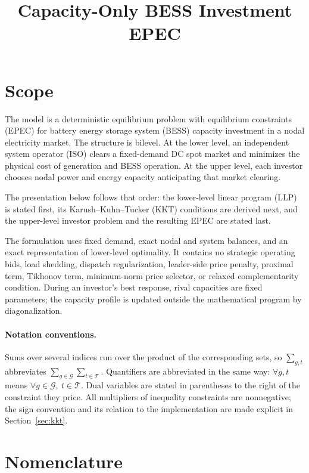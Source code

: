 \documentclass[11pt,a4paper,fleqn]{article}
\title{Capacity-Only BESS Investment EPEC}
\author{}
\date{}
\numberwithin{equation}{section}
\begin{document}
\maketitle

\section{Scope}

The model is a deterministic equilibrium problem with equilibrium constraints
(EPEC) for battery energy storage system (BESS) capacity investment in a nodal
electricity market. The structure is bilevel. At the lower level, an
independent system operator (ISO) clears a fixed-demand DC spot market and
minimizes the physical cost of generation and BESS operation. At the upper
level, each investor chooses nodal power and energy capacity anticipating that
market clearing.

The presentation below follows that order: the lower-level linear program
(LLP) is stated first, its Karush--Kuhn--Tucker (KKT) conditions are derived
next, and the upper-level investor problem and the resulting EPEC are stated
last.

The formulation uses fixed demand, exact nodal and system balances, and an
exact representation of lower-level optimality. It contains no strategic
operating bids, load shedding, dispatch regularization, leader-side price
penalty, proximal term, Tikhonov term, minimum-norm price selector, or relaxed
complementarity condition. During an investor's best response, rival
capacities are fixed parameters; the capacity profile is updated outside the
mathematical program by diagonalization.

\paragraph{Notation conventions.}
Sums over several indices run over the product of the corresponding sets, so
$\sum_{g,t}$ abbreviates $\sum_{g\in\mathcal G}\sum_{t\in\mathcal T}$.
Quantifiers are abbreviated in the same way: $\forall g,t$ means
$\forall g\in\mathcal G,\ t\in\mathcal T$. Dual variables are stated in
parentheses to the right of the constraint they price. All multipliers of
inequality constraints are nonnegative; the sign convention and its relation
to the implementation are made explicit in Section~\ref{sec:kkt}.

\section{Nomenclature}
\end{document}
